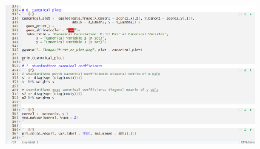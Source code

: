 \documentclass[11pt]{article}
\begin{document}
	\begin{figure}[h]
		\centering
		\includegraphics[width=0.7\linewidth]{../Image/5}
	\end{figure}
	
	
\end{document}
